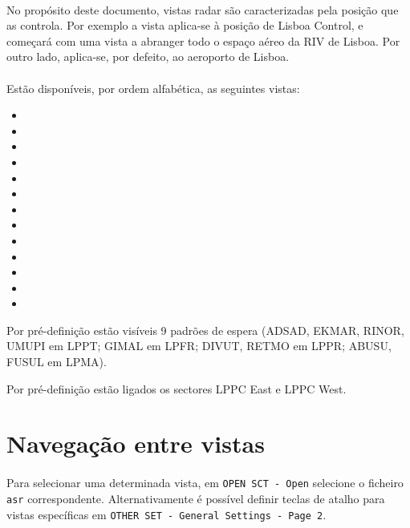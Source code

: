 \documentclass[10pt]{report}
\begin{document}
\paragraph{} No propósito deste documento, vistas radar são caracterizadas pela posição que as
controla. Por exemplo a vista  aplica-se à posição de Lisboa Control, e começará com
uma vista a abranger todo o espaço aéreo da RIV de Lisboa. Por outro lado, 
aplica-se, por defeito, ao aeroporto de Lisboa.

\paragraph{} Estão disponíveis, por ordem alfabética, as seguintes vistas:
\begin{itemize}
    \item {}
    \item {}
    \item {}
    \item {}
    \item {}
    \item {}
    \item {}
    \item {}
    \item {}
    \item {}
    \item {}
    \item {}
    \item {}
\end{itemize}

Por pré-definição estão visíveis 9 padrões de espera (ADSAD, EKMAR, RINOR, UMUPI em LPPT;
GIMAL em LPFR; DIVUT, RETMO em LPPR; ABUSU, FUSUL em LPMA).

Por pré-definição estão ligados os sectores LPPC East e LPPC West.

\section{Navegação entre vistas}

\paragraph{} Para selecionar uma determinada vista, em \texttt{OPEN SCT - Open} selecione o ficheiro
\texttt{asr} correspondente. Alternativamente é possível definir teclas de atalho para vistas
específicas em \texttt{OTHER SET - General Settings - Page 2}.
\end{document}
